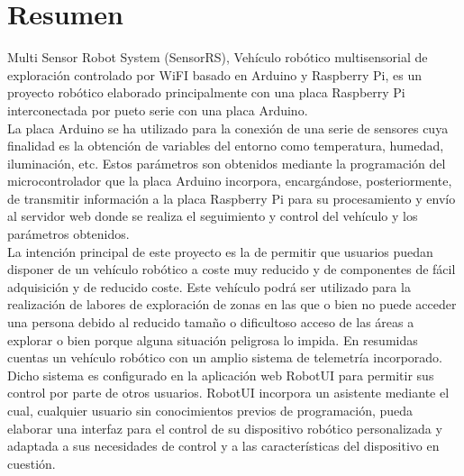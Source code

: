 

\section*{Resumen}
\label{resumen}

Multi Sensor Robot System (SensorRS), Vehículo robótico multisensorial de exploración controlado por WiFI basado en Arduino y Raspberry Pi, es un proyecto robótico elaborado
principalmente con una placa Raspberry Pi interconectada por pueto serie con una placa Arduino. \\

La placa Arduino se ha utilizado para la conexión de una serie de sensores cuya
finalidad es la obtención de variables del entorno como temperatura, humedad, iluminación, etc. Estos parámetros son obtenidos mediante la programación del microcontrolador 
que la placa Arduino incorpora, encargándose, posteriormente, de transmitir información a la placa Raspberry Pi para su procesamiento y envío al servidor web donde se realiza
el seguimiento y control del vehículo y los parámetros obtenidos.\\

La intención principal de este proyecto es la de permitir que usuarios puedan disponer de un vehículo robótico a coste muy reducido y de componentes de fácil adquisición y
de reducido coste. Este vehículo podrá ser utilizado para la realización de labores de exploración de zonas en las que o bien no puede acceder una persona debido al reducido tamaño o 
dificultoso acceso de las áreas a explorar o bien porque alguna situación peligrosa lo impida. En resumidas cuentas un vehículo robótico con un amplio sistema de telemetría incorporado.\\

Dicho sistema es configurado en la aplicación web RobotUI para permitir sus control por parte de otros usuarios. RobotUI incorpora un asistente mediante el cual, cualquier usuario 
sin conocimientos previos de programación, pueda elaborar una interfaz para el control de su dispositivo robótico personalizada y adaptada a sus necesidades de control 
y a las características del dispositivo en cuestión.\\

